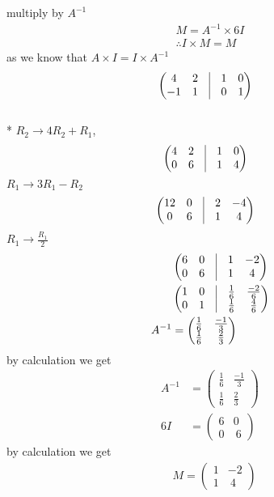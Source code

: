 \documentclass[journal,12pt,twocolumn]{IEEEtran}
\newcommand{\myvec}[1]{\ensuremath{\begin{pmatrix}#1\end{pmatrix}}}
\begin{document}
 \centering multiply by $ A^{-1}$
 \begin{align}  
     M=A^{-1}\times 6I\\  \therefore I\times M=M
    \end{align}
    as we know that  $A \times I=I\times A^{-1}$
   	\begin{align}
   	&\myvec{4 &2 & \vrule &1&0\\ -1&1&\vrule&0&1}
	\end{align}\\* 
$R_2\rightarrow 4R_2+R_1$,
\begin{align}
	&\myvec{4 &2 & \vrule &1&0\\ 0&6&\vrule&1&4}
\end{align}
$R_1\rightarrow 3R_1-R_2$
\begin{align}
	 &\myvec{12&0& \vrule &2&-4\\0&6&\vrule&1&4}
\end{align}
$R_1\rightarrow \frac{R_1}{2}$
\begin{align}
&\myvec{6 &0 & \vrule &1&-2\\ 0&6&\vrule&1&4}\\
&\myvec{1 &0 & \vrule&\frac{1}{6}&\frac{-2}{6}\\ 0&1&\vrule&\frac{1}{6}&\frac{4}{6}}\\
  A^{-1}&=\myvec{
      \frac{1}{6} & \frac{-1}{3}\\
    \frac{1}{6} & \frac{2}{3}
     }
\end{align}
by calculation we get   
 \begin{align}
 A^{-1}&=\myvec{
      \frac{1}{6} & \frac{-1}{3}\\
    \frac{1}{6} & \frac{2}{3}
     }\\
     6I&=\myvec{
    6&0 \\
    0 & \ 6
     }
 \end{align}    
by calculation we get 
 \begin{align}
  &M=\myvec{
    1&-2 \\
    1 & \ 4
     }
 \end{align}   
\end{document}
